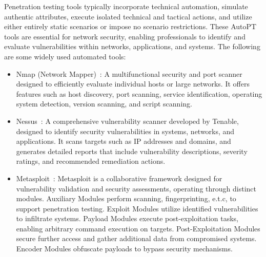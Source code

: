 Penetration testing tools typically incorporate technical automation, simulate authentic attributes, execute isolated technical and tactical actions, and utilize either entirely static scenarios or impose no scenario restrictions. These AutoPT tools are essential for network security, enabling professionals to identify and evaluate vulnerabilities within networks, applications, and systems.
The following are some widely used automated tools:

\begin{itemize}
    \item Nmap (Network Mapper)~\cite{lyon2009nmap}: A multifunctional security and port scanner designed to efficiently evaluate individual hosts or large networks. It offers features such as host discovery, port scanning, service identification, operating system detection, version scanning, and script scanning.
    \item Nessus~\cite{TenableNessus}: A comprehensive vulnerability scanner developed by Tenable, designed to identify security vulnerabilities in systems, networks, and applications. It scans targets such as IP addresses and domains, and generates detailed reports that include vulnerability descriptions, severity ratings, and recommended remediation actions.
    \item Metasploit~\cite{MetasploitWebsite}: Metasploit is a collaborative framework designed for vulnerability validation and security assessments, operating through distinct modules. Auxiliary Modules perform scanning, fingerprinting, e.t.c, to support penetration testing. Exploit Modules utilize identified vulnerabilities to infiltrate systems. Payload Modules execute post-exploitation tasks, enabling arbitrary command execution on targets. Post-Exploitation Modules secure further access and gather additional data from compromised systems. Encoder Modules obfuscate payloads to bypass security mechanisms.


\end{itemize}

